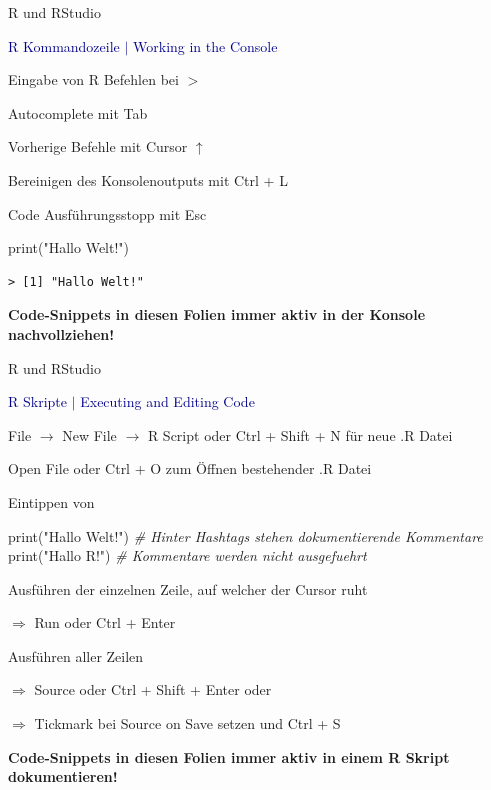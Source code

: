 \documentclass[
  8pt,
  ignorenonframetext,
]{beamer}
\newenvironment{Shaded}{\begin{snugshade}}{\end{snugshade}}
\newcommand{\CommentTok}[1]{\textcolor[rgb]{0.56,0.35,0.01}{\textit{#1}}}
\newcommand{\FunctionTok}[1]{\textcolor[rgb]{0.00,0.00,0.00}{#1}}
\newcommand{\NormalTok}[1]{#1}
\newcommand{\StringTok}[1]{\textcolor[rgb]{0.31,0.60,0.02}{#1}}
\begin{document}
\begin{frame}[fragile]{R und RStudio}
\protect\hypertarget{r-und-rstudio-9}{}
\large

\textcolor{darkblue}{R Kommandozeile $\vert$ Working in the Console}
\normalsize

Eingabe von R Befehlen bei \(>\)

Autocomplete mit Tab

Vorherige Befehle mit Cursor \(\uparrow\)

Bereinigen des Konsolenoutputs mit Ctrl + L

Code Ausführungsstopp mit Esc

\begin{Shaded}
\begin{Highlighting}[]
\FunctionTok{print}\NormalTok{(}\StringTok{"Hallo Welt!"}\NormalTok{)}
\end{Highlighting}
\end{Shaded}

\begin{verbatim}
> [1] "Hallo Welt!"
\end{verbatim}

\textbf{Code-Snippets in diesen Folien immer aktiv in der Konsole
nachvollziehen!}
\end{frame}

\begin{frame}[fragile]{R und RStudio}
\protect\hypertarget{r-und-rstudio-10}{}
\large

\textcolor{darkblue}{R Skripte $\vert$ Executing and Editing Code}
\small

File \(\rightarrow\) New File \(\rightarrow\) R Script oder Ctrl + Shift
+ N für neue .R Datei

Open File oder Ctrl + O zum Öffnen bestehender .R Datei

Eintippen von

\begin{Shaded}
\begin{Highlighting}[]
\FunctionTok{print}\NormalTok{(}\StringTok{"Hallo Welt!"}\NormalTok{)  }\CommentTok{\# Hinter Hashtags stehen dokumentierende Kommentare}
\FunctionTok{print}\NormalTok{(}\StringTok{"Hallo R!"}\NormalTok{)     }\CommentTok{\# Kommentare werden nicht ausgefuehrt}
\end{Highlighting}
\end{Shaded}

Ausführen der einzelnen Zeile, auf welcher der Cursor ruht

\(\Rightarrow\) Run oder Ctrl + Enter

Ausführen aller Zeilen

\(\Rightarrow\) Source oder Ctrl + Shift + Enter oder

\(\Rightarrow\) Tickmark bei Source on Save setzen und Ctrl + S

\textbf{Code-Snippets in diesen Folien immer aktiv in einem R Skript
dokumentieren!}
\end{frame}
\end{document}
